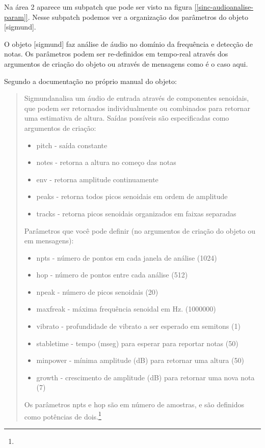 \documentclass{ppgmus}
\begin{document}
Na área 2 aparece um subpatch que pode ser visto na figura
\ref{[sinc-audioanalise-param]}. Nesse subpatch podemos ver 
a organização dos parâmetros do objeto [sigmund\texttildelow].

O objeto [sigmund\texttildelow] faz análise de áudio no domínio da 
frequência e detecção de notas. Os parâmetros podem ser re-definidos
em tempo-real através dos argumentos de criação do objeto ou através
de mensagens como é o caso aqui.


Segundo a documentação no próprio manual do objeto:
\begin{quote}
 Sigmund\texttildelow analisa um áudio de entrada através de componentes senoidais,
que podem ser retornados individualmente ou combinados para
retornar uma estimativa de altura. Saídas possíveis são especificadas
como argumentos de criação:

\begin{itemize}
 \item pitch - saída constante
 \item notes - retorna a altura no começo das notas 
 \item env - retorna amplitude continuamente
 \item peaks - retorna todos picos senoidais em ordem de amplitude
 \item tracks - retorna picos senoidais organizados em faixas separadas
\end{itemize}

Parâmetros que você pode definir (no argumentos de criação do objeto ou em mensagens):

\begin{itemize}
 \item npts - número de pontos em cada janela de análise (1024)
 \item hop - número de pontos entre cada análise (512)
 \item npeak - número de picos senoidais (20)
 \item maxfreak - máxima frequência senoidal em Hz. (1000000)
 \item vibrato - profundidade de vibrato a ser esperado em semitons (1)
 \item stabletime - tempo (mseg) para esperar para reportar notas (50)
 \item minpower - mínima amplitude (dB) para retornar uma altura (50)
 \item growth - crescimento de amplitude (dB) para retornar uma nova nota (7) 
\end{itemize}
Os parâmetros npts e hop são em número de amostras, e são definidos como potências de dois.\footnote{

}
\end{quote}
\end{document}
